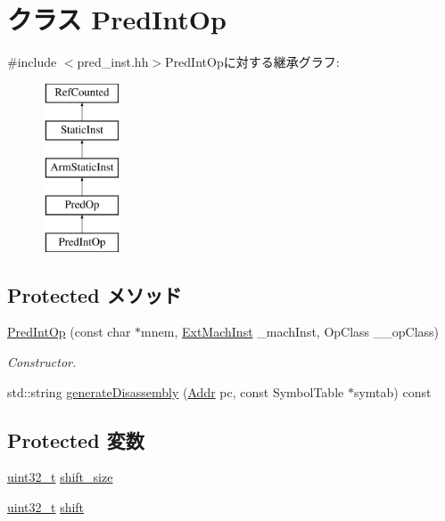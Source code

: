 \hypertarget{classArmISA_1_1PredIntOp}{
\section{クラス PredIntOp}
\label{classArmISA_1_1PredIntOp}
}


{\ttfamily \#include $<$pred\_\-inst.hh$>$}PredIntOpに対する継承グラフ:\begin{figure}[H]
\begin{center}
\leavevmode
\includegraphics[height=5cm]{classArmISA_1_1PredIntOp}
\end{center}
\end{figure}
\subsection*{Protected メソッド}
\begin{DoxyCompactItemize}
\item 
\hyperlink{classArmISA_1_1PredIntOp_a5d6a0a4ebb8d55a8b0ee636f8642a9f6}{PredIntOp} (const char $\ast$mnem, \hyperlink{classStaticInst_a5605d4fc727eae9e595325c90c0ec108}{ExtMachInst} \_\-machInst, OpClass \_\-\_\-opClass)
\begin{DoxyCompactList}\small\item\em Constructor. \item\end{DoxyCompactList}\item 
std::string \hyperlink{classArmISA_1_1PredIntOp_a95d323a22a5f07e14d6b4c9385a91896}{generateDisassembly} (\hyperlink{classm5_1_1params_1_1Addr}{Addr} pc, const SymbolTable $\ast$symtab) const 
\end{DoxyCompactItemize}
\subsection*{Protected 変数}
\begin{DoxyCompactItemize}
\item 
\hyperlink{Type_8hh_a435d1572bf3f880d55459d9805097f62}{uint32\_\-t} \hyperlink{classArmISA_1_1PredIntOp_a56a42ca0919e01ae2140b65e625c4be8}{shift\_\-size}
\item 
\hyperlink{Type_8hh_a435d1572bf3f880d55459d9805097f62}{uint32\_\-t} \hyperlink{classArmISA_1_1PredIntOp_ae94a7e9e52306e4a9b768d55ffb25bc4}{shift}
\end{DoxyCompactItemize}


